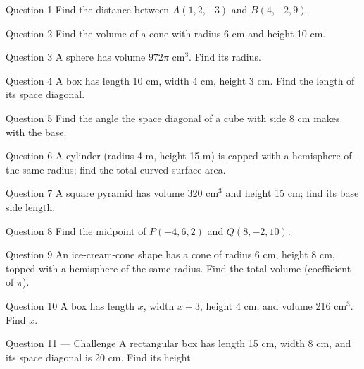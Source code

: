 \documentclass[11pt]{article}
\begin{document}
\begin{qbox}{Question 1}
Find the distance between $A(1,2,-3)$ and $B(4,-2,9)$.\workspace{2.4cm}
\end{qbox}

\begin{qbox}{Question 2}
Find the volume of a cone with radius 6 cm and height 10 cm.\workspace{2.4cm}
\end{qbox}

\begin{qbox}{Question 3}
A sphere has volume $972\pi$ cm$^3$. Find its radius.\workspace{2.4cm}
\end{qbox}

\begin{qbox}{Question 4}
A box has length 10 cm, width 4 cm, height 3 cm. Find the length of its space diagonal.\workspace{2.4cm}
\end{qbox}

\begin{qbox}{Question 5}
Find the angle the space diagonal of a cube with side 8 cm makes with the base.\workspace{2.4cm}
\end{qbox}

\begin{qbox}{Question 6}
A cylinder (radius 4 m, height 15 m) is capped with a hemisphere of the same radius; find the total curved surface area.\workspace{2.4cm}
\end{qbox}

\begin{qbox}{Question 7}
A square pyramid has volume 320 cm$^3$ and height 15 cm; find its base side length.\workspace{2.4cm}
\end{qbox}

\begin{qbox}{Question 8}
Find the midpoint of $P(-4,6,2)$ and $Q(8,-2,10)$.\workspace{2.4cm}
\end{qbox}

\begin{qbox}{Question 9}
An ice-cream-cone shape has a cone of radius 6 cm, height 8 cm, topped with a hemisphere of the same radius. Find the total volume (coefficient of $\pi$).\workspace{2.4cm}
\end{qbox}

\begin{qbox}{Question 10}
A box has length $x$, width $x+3$, height 4 cm, and volume 216 cm$^3$. Find $x$.\workspace{2.4cm}
\end{qbox}

\begin{qbox}{Question 11 --- Challenge}
A rectangular box has length 15 cm, width 8 cm, and its space diagonal is 20 cm. Find its height.\workspace{3.2cm}
\end{qbox}
\end{document}
